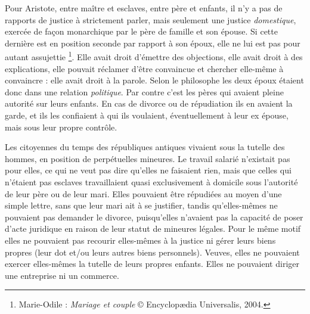 Pour Aristote, entre maître et esclaves, entre père et enfants, il n'y
a pas de rapports de justice à strictement parler, mais seulement une
justice \emph{domestique}, exercée de façon monarchique par le père de famille et
son épouse. Si cette dernière est en position seconde par rapport à son
époux, elle ne lui est pas pour autant assujettie%
\footnote{
Marie-Odile  : \emph{Mariage et couple} © Encyclopædia Universalis, 2004.}.
Elle avait droit
d'émettre des objections, elle avait droit à des explications, elle pouvait
réclamer d'être convaincue et chercher elle-même à convaincre : elle avait
droit à la parole. Selon le philosophe les deux époux étaient donc dans
une relation \emph{politique}. Par contre c'est les pères qui avaient pleine autorité
sur leurs enfants. En cas de divorce ou de répudiation ils en avaient la
garde, et ils les confiaient à qui ils voulaient, éventuellement à leur ex
épouse, mais sous leur propre contrôle.

Les citoyennes du temps des républiques antiques vivaient sous la
tutelle des hom\-mes, en position de perpétuelles mineures. Le travail salarié
n'existait pas pour elles, ce qui ne veut pas dire qu'elles ne faisaient
rien, mais que celles qui n'étaient pas esclaves travaillaient quasi exclusivement
à domicile sous l'autorité de leur père ou de leur mari. Elles pouvaient
être répudiées au moyen d'une simple lettre, sans que leur mari ait
à se justifier, tandis qu'elles-mêmes ne pouvaient pas demander le divorce,
puisqu'elles n'avaient pas la capacité de poser d'acte juridique en raison
de leur statut de mineures légales. Pour le même motif elles ne pouvaient
pas recourir elles-mêmes à la justice ni gérer leurs biens propres
(leur dot et/ou leurs autres biens personnels). Veuves, elles ne pouvaient
exercer elles-mêmes la tutelle de leurs propres enfants. Elles ne pouvaient
diriger une entreprise ni un commerce.

